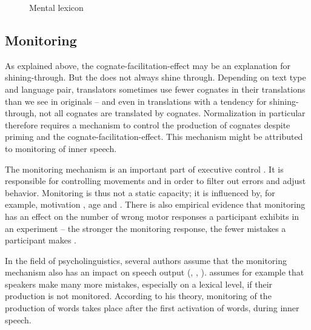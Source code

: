 \documentclass[output=paper]{LSP/langsci}
\begin{document}
\begin{figure}
{
    }
    \caption{Mental lexicon}
    \label{oster:fig:2}
\end{figure}

\subsection{Monitoring}\label{oster:sec:1.5}
As explained above, the cognate-facilitation-effect may be an explanation for shining-through. But the  does not always shine through. Depending on text type and language pair, translators sometimes use fewer cognates in their translations than we see in originals \citep{Vintar2005} -- and even in translations with a tendency for shining-through, not all  cognates are translated by  cognates. Normalization in particular therefore requires a mechanism to control the production of cognates despite priming and the cognate-facilitation-effect. This mechanism might be attributed to monitoring of inner speech.

The monitoring mechanism is an important part of executive control \citep{Ganushchak2006}. It is responsible for controlling movements and  in order to filter out errors and adjust behavior. Monitoring is thus not a static capacity; it is influenced by, for example, motivation \citep{Ganushchak2008}, age \citep{Wiersema2007} and  \citep{Ganushchak2006}. There is also empirical evidence that monitoring has an effect on the number of wrong motor responses a participant exhibits in an experiment -- the stronger the monitoring response, the fewer mistakes a participant makes \citep{Hajcak2003}. 

In the field of psycholinguistics, several authors assume that the monitoring mechanism also has an impact on speech output (\citealt{Aitchison2012},  \citealt{DeGroot2011}, \citealt{Levelt1999}). \citet{Levelt1999} assumes for example that speakers make many more mistakes, especially on a lexical level, if their production is not monitored. According to his theory, monitoring of the production of words takes place after the first activation of words, during inner speech. 
\end{document}
